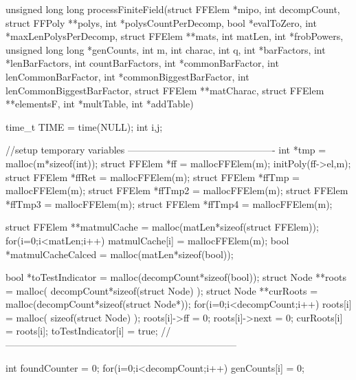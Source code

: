 \begin{ccode}[caption={[\texttt{unsigned long long processFiniteField} aus 
 \url{../Sage/enumeratePCNs.c}]Aus \url{../Sage/enumeratePCNs.c}},
  label=lst:processFiniteField]
unsigned long long processFiniteField(struct FFElem *mipo, int decompCount,
        struct FFPoly **polys, int *polysCountPerDecomp,
        bool *evalToZero, int *maxLenPolysPerDecomp,
        struct FFElem **mats, int matLen, int *frobPowers,
        unsigned long long *genCounts, int m, int charac, int q,
        int *barFactors, int *lenBarFactors, int countBarFactors,
        int *commonBarFactor, int lenCommonBarFactor,
        int *commonBiggestBarFactor, int lenCommonBiggestBarFactor,
        struct FFElem **matCharac, struct FFElem **elementsF,
        int *multTable, int *addTable){
    time_t TIME = time(NULL);
    int i,j;

    //setup temporary variables ----------------------------------------------
    int *tmp = malloc(m*sizeof(int));
    struct FFElem *ff = mallocFFElem(m);
    initPoly(ff->el,m);
    struct FFElem *ffRet = mallocFFElem(m);
    struct FFElem *ffTmp = mallocFFElem(m);
    struct FFElem *ffTmp2 = mallocFFElem(m);
    struct FFElem *ffTmp3 = mallocFFElem(m);
    struct FFElem *ffTmp4 = mallocFFElem(m);
    
    struct FFElem **matmulCache = malloc(matLen*sizeof(struct FFElem));
    for(i=0;i<matLen;i++) matmulCache[i] = mallocFFElem(m);
    bool *matmulCacheCalced = malloc(matLen*sizeof(bool));
    
    bool *toTestIndicator = malloc(decompCount*sizeof(bool));
    struct Node **roots = malloc( decompCount*sizeof(struct Node) );
    struct Node **curRoots = malloc(decompCount*sizeof(struct Node*));
    for(i=0;i<decompCount;i++){
        roots[i] = malloc( sizeof(struct Node) );
        roots[i]->ff = 0;
        roots[i]->next = 0;
        curRoots[i] = roots[i];
        toTestIndicator[i] = true;
    }
    //------------------------------------------------------------------------
    
    int foundCounter = 0;
    for(i=0;i<decompCount;i++) genCounts[i] = 0;

}
\end{ccode}
